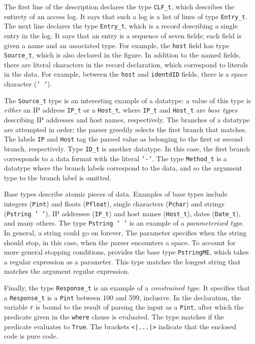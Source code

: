 \documentclass{sig-alternate}
\begin{document}
The first line of the description declares the type \texttt{CLF\_t},
which describes the entirety of an access log.  It says that such a
log is a list of lines of type \texttt{Entry\_t}.  The next line
declares the type \texttt{Entry\_t}, which is a record describing a
single entry in the log.  It says that an entry is a sequence of seven
fields; each field is given a name and an associated type.  For
example, the \texttt{host} field has type \texttt{Source\_t}, which is
also declared in the figure.  In addition to the named fields, there
are literal characters in the record declaration, which correspond to
literals in the data.  For example, between the \texttt{host} and
\texttt{identdID} fields, there is a space character (\texttt{' '}).

The \texttt{Source\_t} type is an interesting example of a
datatype: a value of this type is \textit{either} an IP address
\texttt{IP\_t} or a \texttt{Host\_t}, where \texttt{IP\_t} and
\texttt{Host\_t} are \pads{} \textit{base types} describing IP
addresses and host names, respectively.  The branches of a datatype
are attempted in order; the parser greedily selects the first branch
that matches.   The labels \texttt{IP} and \texttt{Host} tag the
parsed value as belonging to the first or second branch, respectively.
Type \texttt{ID\_t} is another datatype. In this case, the first
branch corresponds to a data format with the literal \texttt{'-'}. The
type \texttt{Method\_t} is a datatype where the branch labels
correspond to the data, and so the argument type to the branch label
is omitted.  

Base types describe atomic pieces of data.  Examples of base types include integers
(\texttt{Pint}) and floats (\texttt{Pfloat}), single characters
(\texttt{Pchar}) and strings (\texttt{Pstring ' '}), IP addresses
(\texttt{IP\_t}) and host names (\texttt{Host\_t}), dates
(\texttt{Date\_t}), and many others. 
The type
\texttt{Pstring ' '} is an example of a \textit{parameterized type}.
In general, a string could go on forever.  The parameter specifies
when the string should stop, in this case, when the parser encounters
a space.  To account for more general stopping conditions,
\padshaskell{} provides the base type \texttt{PstringME}, which takes
a regular expression as a parameter.  This type matches the longest
string that matches the argument regular expression.

Finally, the type \texttt{Response\_t} is an example of a
\textit{constrained type}. It specifies that a \texttt{Response\_t} is
a \texttt{Pint} between 100 and 599, inclusive. In the declaration,
the variable \texttt{r} is bound to the result of parsing the input as
a \texttt{Pint}, after which the predicate given in the \texttt{where}
clause is evaluated. The type matches if the predicate evaluates to
\texttt{True}.  The brackets \texttt{<|...|>} indicate that
the enclosed code is pure \haskell{} code.
\end{document}
